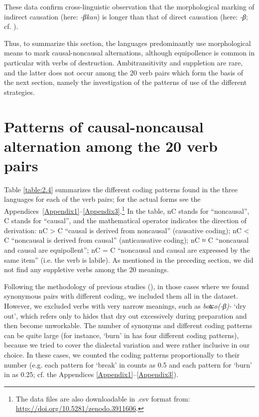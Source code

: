 \documentclass[output=paper,colorlinks,citecolor=brown]{langscibook}
\begin{document}
These data confirm  cross-linguistic observation that the morphological marking of indirect causation (here: \textit{-βkan}) is longer than that of direct causation (here: \textit{-β}; cf. \citealt[784--788]{Haiman1983}).

\begin{sloppypar}
Thus, to summarize this section, the  languages predominantly use morphological means to mark causal-noncausal alternations, although equipollence is common in particular with verbs of destruction. Ambitransitivity and suppletion are rare, and the latter does not occur among the 20 verb pairs which form the basis of the next section, namely the investigation of the patterns of use of the different strategies.
\end{sloppypar}

\section{Patterns of causal-noncausal alternation among the 20 verb pairs}\label{section2.4}

Table \ref{table:2.4} summarizes the different coding patterns found in the three languages for each of the verb pairs; for the actual forms see the Appendices~\ref{Appendix1}–\ref{Appendix3}.\footnote{The data files are also downloadable in .csv format from: \url{http://doi.org/10.5281/zenodo.3911606}.} In the table, nC stands for “noncausal”, C stands for “causal”, and the mathematical operator indicates the direction of derivation: nC > C “causal is derived from noncausal” (causative coding); nC < C “noncausal is derived from causal” (anticausative coding); nC ≈ C “noncausal and causal are equipollent”; nC = C “noncausal and causal are expressed by the same item” (i.e. the verb is labile). As mentioned in the preceding section, we did not find any suppletive verbs among the 20 meanings.

\begin{sloppypar}
Following the methodology of previous studies (\citealt{Haspelmath1993,Comrie2006}), in those cases where we found synonymous pairs with different coding, we included them all in the dataset. However, we excluded verbs with very narrow meanings, such as  \textit{boʨo(-β)-} ‘dry out’, which refers only to hides that dry out excessively during preparation and then become unworkable. The number of synonyms and different coding patterns can be quite large (for instance, ‘burn’ in  has four different coding patterns), because we tried to cover the dialectal variation and were rather inclusive in our choice. In these cases, we counted the coding patterns proportionally to their number (e.g. each pattern for ‘break’ in  counts as 0.5 and each pattern for ‘burn’ in  as 0.25; cf. the Appendices \ref{Appendix1}--\ref{Appendix3}).
\end{sloppypar}
\end{document}
